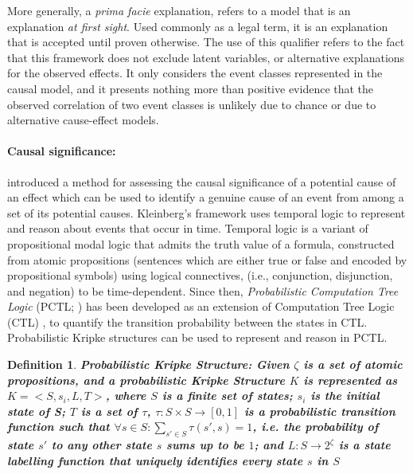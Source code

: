 \documentclass[man,biblatex,floatsintext]{apa6}
\newtheorem{defn}[thm]{Definition}
\begin{document}
More generally, a \emph{prima facie} explanation, refers to a model that is an explanation \emph{at first sight}.  Used commonly as a legal term, it is an explanation that is accepted until proven otherwise.  The use of this qualifier refers to the fact that this framework does not exclude latent variables, or alternative explanations for the observed effects.  It only considers the event classes represented in the causal model, and it presents nothing more than positive evidence that the observed correlation of two event classes is unlikely due to chance or due to alternative cause-effect models.


\paragraph{Causal significance: }

\textcite{kleinberg2012causality} introduced a method for assessing the causal significance of a potential cause of an effect which can be used to identify a genuine cause of an event from among a set of its potential causes. Kleinberg's framework uses temporal logic \parencite{prior1967past} to represent and reason about events that occur in time. Temporal logic is a variant of propositional modal logic that admits the truth value of a formula, constructed from atomic propositions (sentences which are either true or false and encoded by propositional symbols) using logical connectives, (i.e., conjunction, disjunction, and negation) to be time-dependent. Since then, \emph{Probabilistic Computation Tree Logic} (PCTL; \cite{hansson1994logic}) has been developed as an extension of  Computation Tree Logic (CTL) \parencite{clarke1999model}, to quantify the transition probability between the states in CTL. Probabilistic Kripke structures \parencite{clarke1999model} can be used to represent and reason in PCTL.

\begin{defn} \textbf{Probabilistic Kripke Structure: Given $\zeta$ is a set of atomic propositions, and a probabilistic Kripke Structure $K$ is represented as $K=<S,s_{i},L,T>$, where $S$ is a finite set of states; $s_{i}$ is the initial state of S;  $T$ is a set of $\tau$, $\tau : S \times S \rightarrow [0,1]$ is a probabilistic transition function such that $\forall s \in S: \sum_{{s}' \in S} \tau ({s}',s) = 1$, i.e. the probability of state ${s}'$ to any other state $s$ sums up to be $1$; and $L:S \rightarrow 2^{\zeta}$ is a state labelling function that uniquely identifies every state $s$ in $S$}
\end{defn}
\end{document}
